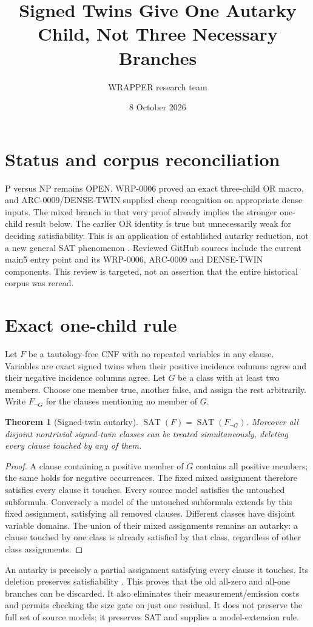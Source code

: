 \documentclass[11pt]{article}
\title{Signed Twins Give One Autarky Child, Not Three Necessary Branches}
\author{WRAPPER research team}\date{8 October 2026}
\newtheorem{theorem}{Theorem}
\begin{document}
\maketitle
\section{Status and corpus reconciliation}
P versus NP remains OPEN. WRP-0006 proved an exact three-child OR macro,
and ARC-0009/DENSE-TWIN supplied cheap recognition on appropriate dense
inputs. The mixed branch in that very proof already implies the stronger
one-child result below. The earlier OR identity is true but unnecessarily
weak for deciding satisfiability. This is an application of established
autarky reduction, not a new general SAT phenomenon \cite{autarky}.
Reviewed GitHub sources include the current main5 entry point and its
WRP-0006, ARC-0009 and DENSE-TWIN components. This review is targeted,
not an assertion that the entire historical corpus was reread.

\section{Exact one-child rule}
Let $F$ be a tautology-free CNF with no repeated variables in any clause.
Variables are exact signed twins when their positive incidence columns
agree and their negative incidence columns agree. Let $G$ be a class
with at least two members. Choose one member true, another false,
and assign the rest arbitrarily. Write $F_{\neg G}$ for the clauses
mentioning no member of $G$.
\begin{theorem}[Signed-twin autarky]
$\operatorname{SAT}(F)=\operatorname{SAT}(F_{\neg G})$.
Moreover all disjoint nontrivial signed-twin classes can be treated
simultaneously, deleting every clause touched by any of them.
\end{theorem}
\begin{proof}
A clause containing a positive member of $G$ contains all positive members;
the same holds for negative occurrences. The fixed mixed assignment
therefore satisfies every clause it touches. Every source model satisfies
the untouched subformula. Conversely a model of the untouched subformula
extends by this fixed assignment, satisfying all removed clauses.
Different classes have disjoint variable domains. The union of their
mixed assignments remains an autarky: a clause touched by one class is
already satisfied by that class, regardless of other class assignments.
\end{proof}
An autarky is precisely a partial assignment satisfying every clause
it touches. Its deletion preserves satisfiability \cite{autarky}.
This proves that the old all-zero and all-one branches can be discarded.
It also eliminates their measurement/emission costs and permits checking
the size gate on just one residual. It does not preserve the full set
of source models; it preserves SAT and supplies a model-extension rule.
\end{document}
